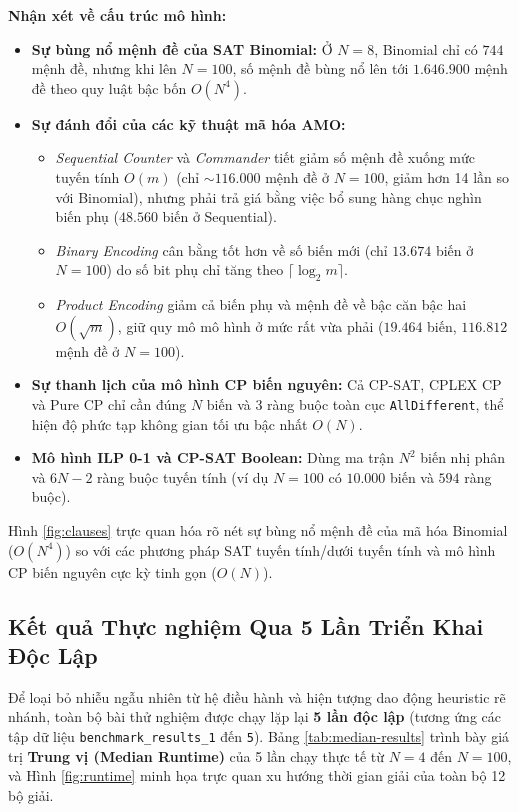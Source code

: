 \documentclass[a4paper,11pt]{article}
\begin{document}
\noindent \textbf{Nhận xét về cấu trúc mô hình:}
\begin{itemize}
    \item \textbf{Sự bùng nổ mệnh đề của SAT Binomial:} Ở $N=8$, Binomial chỉ có $744$ mệnh đề, nhưng khi lên $N=100$, số mệnh đề bùng nổ lên tới $\mathbf{1.646.900}$ mệnh đề theo quy luật bậc bốn $O(N^4)$.
    \item \textbf{Sự đánh đổi của các kỹ thuật mã hóa AMO:}
    \begin{itemize}
        \item \textit{Sequential Counter} và \textit{Commander} tiết giảm số mệnh đề xuống mức tuyến tính $O(m)$ (chỉ $\sim 116.000$ mệnh đề ở $N=100$, giảm hơn 14 lần so với Binomial), nhưng phải trả giá bằng việc bổ sung hàng chục nghìn biến phụ ($48.560$ biến ở Sequential).
        \item \textit{Binary Encoding} cân bằng tốt hơn về số biến mới (chỉ $13.674$ biến ở $N=100$) do số bit phụ chỉ tăng theo $\lceil \log_2 m \rceil$.
        \item \textit{Product Encoding} giảm cả biến phụ và mệnh đề về bậc căn bậc hai $O(\sqrt{m})$, giữ quy mô mô hình ở mức rất vừa phải ($19.464$ biến, $116.812$ mệnh đề ở $N=100$).
    \end{itemize}
    \item \textbf{Sự thanh lịch của mô hình CP biến nguyên:} Cả CP-SAT, CPLEX CP và Pure CP chỉ cần đúng $N$ biến và 3 ràng buộc toàn cục \texttt{AllDifferent}, thể hiện độ phức tạp không gian tối ưu bậc nhất $O(N)$.
    \item \textbf{Mô hình ILP 0-1 và CP-SAT Boolean:} Dùng ma trận $N^2$ biến nhị phân và $6N-2$ ràng buộc tuyến tính (ví dụ $N=100$ có $10.000$ biến và $594$ ràng buộc).
\end{itemize}

Hình \ref{fig:clauses} trực quan hóa rõ nét sự bùng nổ mệnh đề của mã hóa Binomial ($O(N^4)$) so với các phương pháp SAT tuyến tính/dưới tuyến tính và mô hình CP biến nguyên cực kỳ tinh gọn ($O(N)$).

\subsection{Kết quả Thực nghiệm Qua 5 Lần Triển Khai Độc Lập}

Để loại bỏ nhiễu ngẫu nhiên từ hệ điều hành và hiện tượng dao động heuristic rẽ nhánh, toàn bộ bài thử nghiệm được chạy lặp lại \textbf{5 lần độc lập} (tương ứng các tập dữ liệu \texttt{benchmark\_results\_1} đến \texttt{5}). Bảng \ref{tab:median-results} trình bày giá trị \textbf{Trung vị (Median Runtime)} của 5 lần chạy thực tế từ $N = 4$ đến $N = 100$, và Hình \ref{fig:runtime} minh họa trực quan xu hướng thời gian giải của toàn bộ 12 bộ giải.
\end{document}
